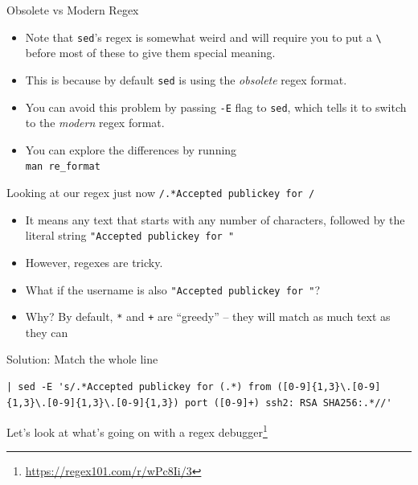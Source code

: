\documentclass[12pt]{beamer}
\begin{document}
\begin{frame}{Obsolete vs Modern Regex}
  \begin{itemize}
    \item Note that \texttt{sed}'s regex is somewhat weird and will require you to put a \texttt{\textbackslash} before most of these to give them special meaning.
    \item This is because by default \texttt{sed} is using the \emph{obsolete} regex format.
    \item You can avoid this problem by passing \texttt{-E} flag to \texttt{sed}, which tells it to switch to the \emph{modern} regex format.
    \item You can explore the differences by running \\\texttt{man re_format}
  \end{itemize}
\end{frame}

\begin{frame}{Looking at our regex just now}
  \texttt{/.*Accepted publickey for /}

  \begin{itemize}
    \item It means any text that starts with any number of characters, followed by the literal string \texttt{"Accepted publickey for "}
    \item However, regexes are tricky.
    \item What if the username is also \texttt{"Accepted publickey for "}?
    \item Why? By default, \texttt{*} and \texttt{+} are ``greedy'' -- they will match as much text as they can
  \end{itemize}
\end{frame}

\begin{frame}[fragile]{Solution: Match the whole line}
  \begin{verbatim}
| sed -E 's/.*Accepted publickey for (.*) from ([0-9]{1,3}\.[0-9]{1,3}\.[0-9]{1,3}\.[0-9]{1,3}) port ([0-9]+) ssh2: RSA SHA256:.*//'
  \end{verbatim}
  Let's look at what's going on with a regex debugger\footnote{\url{https://regex101.com/r/wPc8Ii/3}}
\end{frame}
\end{document}
